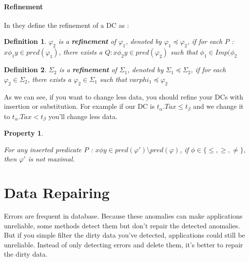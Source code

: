 \documentclass[letterpaper, 12pt]{report}
\newtheorem{mydef}{Definition}
\newtheorem{myprop}{Property}
\begin{document}
\subsubsection{Refinement}

In \cite{main} they define the refinement of a DC as :

\begin{mydef}
 $\varphi_2$ is a \textbf{refinement} of $\varphi_1$, denoted by $\varphi_1 \preceq \varphi_2$, if for each $ P$ : $x\phi_1 y \in pred(\varphi_1)$, there exists a $Q : x \phi_2 y \in pred(\varphi_2)$ such that $\phi_1 \in Imp(\phi_2$
\end{mydef}

\begin{mydef}
 $\Sigma_2$ is a \textbf{refinement} of $\Sigma_1$, denoted by $\Sigma_1 \preceq \Sigma_2$, if for each $ \varphi_2 \in \Sigma_2$, there exists a $\varphi_2 \in \Sigma_1$ such that $varphi_1 \preceq \varphi_2$
\end{mydef}

As we can see, if you want to change less data, you should refine your DCs with insertion or substitution. For example if our DC is $t_\alpha.Tax \leq t_\beta$ and we change it to $t_\alpha.Tax < t_\beta$ you'll change less data.

\begin{myprop}\cite{main}

For any inserted predicate $ P $ : $x \phi y \in pred(\varphi ') \setminus pred(\varphi)$, if $\phi \in \{\leq,\geq,\neq \}$, then $\varphi '$ is not maximal.

\end{myprop}

\chapter{Data Repairing}

Errors are frequent in database. Because these anomalies can make applications unreliable, some methods detect them but don't repair the detected anomalies. But if you simple filter the dirty data you've detected, applications could still be unreliable. \cite{anodetect} Instead of only detecting errors and delete them, it's better to repair the dirty data.\\
\end{document}
